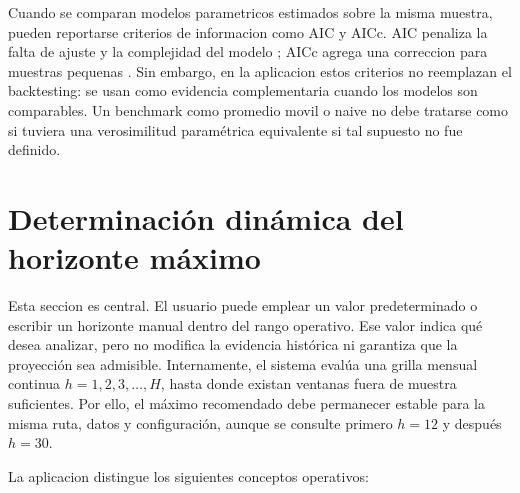 ﻿\documentclass[12pt,letterpaper]{article}
\begin{document}
Cuando se comparan modelos parametricos estimados sobre la misma muestra, pueden reportarse criterios de informacion como AIC y AICc. AIC penaliza la falta de ajuste y la complejidad del modelo \citep{hyndman2021fpp3}; AICc agrega una correccion para muestras pequenas \citep{hyndman_khandakar2008}. Sin embargo, en la aplicacion estos criterios no reemplazan el backtesting: se usan como evidencia complementaria cuando los modelos son comparables. Un benchmark como promedio movil o naive no debe tratarse como si tuviera una verosimilitud paramétrica equivalente si tal supuesto no fue definido.




\section{Determinación dinámica del horizonte máximo}

Esta seccion es central. El usuario puede emplear un valor predeterminado o escribir un horizonte manual dentro del rango operativo. Ese valor indica qué desea analizar, pero no modifica la evidencia histórica ni garantiza que la proyección sea admisible. Internamente, el sistema evalúa una grilla mensual continua \(h=1,2,3,\ldots,H\), hasta donde existan ventanas fuera de muestra suficientes. Por ello, el máximo recomendado debe permanecer estable para la misma ruta, datos y configuración, aunque se consulte primero \(h=12\) y después \(h=30\).

La aplicacion distingue los siguientes conceptos operativos:
\end{document}
